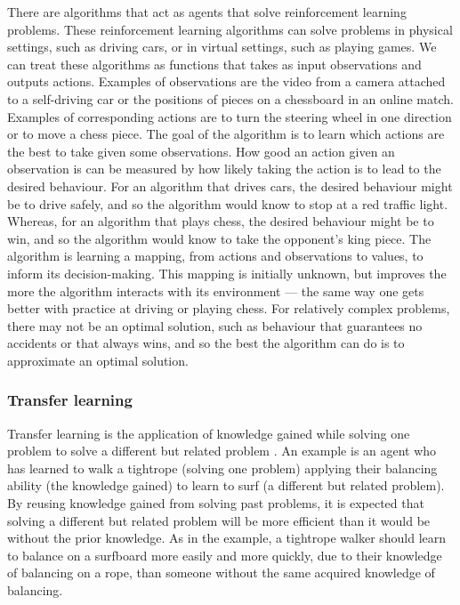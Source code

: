 \documentclass[12pt,a4paper]{article}
\begin{document}
There are algorithms that act as agents that solve reinforcement learning problems. These reinforcement learning algorithms can solve problems in physical settings, such as driving cars, or in virtual settings, such as playing games. We can treat these algorithms as functions that takes as input observations and outputs actions. Examples of observations are the video from a camera attached to a self-driving car or the positions of pieces on a chessboard in an online match. Examples of corresponding actions are to turn the steering wheel in one direction or to move a chess piece. The goal of the algorithm is to learn which actions are the best to take given some observations. How good an action given an observation is can be measured by how likely taking the action is to lead to the desired behaviour. For an algorithm that drives cars, the desired behaviour might be to drive safely, and so the algorithm would know to stop at a red traffic light. Whereas, for an algorithm that plays chess, the desired behaviour might be to win, and so the algorithm would know to take the opponent's king piece. The algorithm is learning a mapping, from actions and observations to values, to inform its decision-making. This mapping is initially unknown, but improves the more the algorithm interacts with its environment --- the same way one gets better with practice at driving or playing chess. For relatively complex problems, there may not be an optimal solution, such as behaviour that guarantees no accidents or that always wins, and so the best the algorithm can do is to approximate an optimal solution. 

\subsubsection{Transfer learning}
Transfer learning is the application of knowledge gained while solving one problem to solve a different but related problem \cite{2010}. An example is an agent who has learned to walk a tightrope (solving one problem) applying their balancing ability (the knowledge gained) to learn to surf (a different but related problem). By reusing knowledge gained from solving past problems, it is expected that solving a different but related problem will be more efficient than it would be without the prior knowledge. As in the example, a tightrope walker should learn to balance on a surfboard more easily and more quickly, due to their knowledge of balancing on a rope, than someone without the same acquired knowledge of balancing. 
\end{document}
